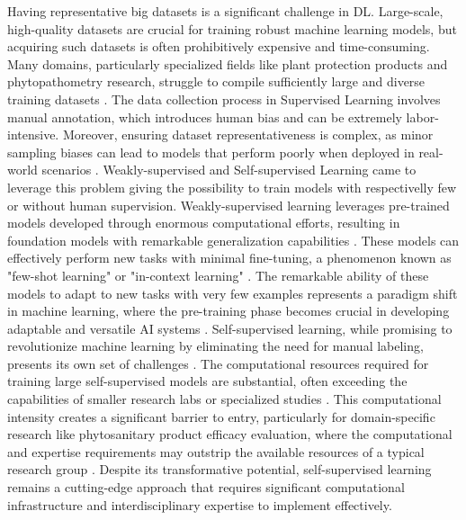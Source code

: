\documentclass[12pt,a4paper,oneside]{report}
\begin{document}
Having representative big datasets is a significant challenge in DL. 
Large-scale, high-quality datasets are crucial for training robust machine learning models, but acquiring 
such datasets is often prohibitively expensive and time-consuming. Many domains, particularly specialized 
fields like plant protection products and phytopathometry research, 
struggle to compile sufficiently large and diverse training datasets \cite{alom2019state}. The data collection process 
in Supervised Learning involves manual annotation, which introduces human bias and can be extremely labor-intensive. 
Moreover, ensuring dataset representativeness is complex, as minor sampling biases can lead to models 
that perform poorly when deployed in real-world scenarios \cite{torralba2011tiny}.
Weakly-supervised and Self-supervised Learning came to leverage this problem giving the possibility
to train models with respectivelly few or without human supervision.
Weakly-supervised learning leverages pre-trained models developed through enormous computational efforts, 
resulting in foundation models with remarkable generalization capabilities \cite{radford_learning_2021}. 
These models can effectively perform new tasks with minimal fine-tuning, a phenomenon known as 
"few-shot learning" or "in-context learning" \cite{brown_language_2020}. The remarkable ability of 
these models to adapt to new tasks with very few examples represents a paradigm shift in machine 
learning, where the pre-training phase becomes crucial in developing adaptable and versatile 
AI systems \cite{bommasani_opportunities_2022}.
Self-supervised learning, while promising to revolutionize machine learning by eliminating 
the need for manual labeling, presents its own set of challenges \cite{he_momentum_2020}. 
The computational resources required for training large self-supervised models are substantial, 
often exceeding the capabilities of smaller research labs or specialized studies \cite{patterson_carbon_2021}. 
This computational intensity creates a significant barrier to entry, particularly for domain-specific 
research like phytosanitary product efficacy evaluation, where the computational and expertise 
requirements may outstrip the available resources of a typical research group 
\cite{strubell_energy_2019}. Despite its transformative potential, self-supervised learning remains a 
cutting-edge approach that requires significant computational infrastructure and interdisciplinary expertise to implement effectively.
\end{document}
